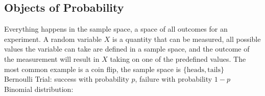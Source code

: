 \subsection{Objects of Probability}
Everything happens in the sample space, a space of all outcomes for an experiment. 
A random variable \(X\) is a quantity that can be measured, all possible values the variable can take are defined in a sample space, and the outcome of the measurement will result in \(X\) taking on one of the predefined values. The most common example is a coin flip, the sample space is \(\{\text{heads},\text{tails}\}\)
\\
Bernoulli Trial: success with probability \(p\), failure with probability \(1-p\)
\\
Binomial distribution: 